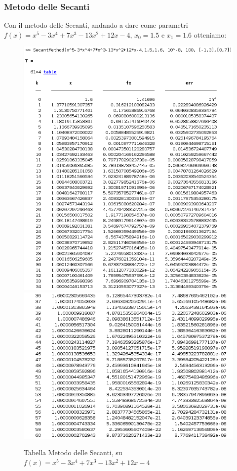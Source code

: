 \documentclass[12pt, letterpaper]{article}
\begin{document}
\subsubsection{Metodo delle Secanti}
Con il metodo delle Secanti, andando a dare come parametri $f(x)=x^5-3x^4+7x^3-13x^2+12x-4$, $x_0=  1.5$ e $x_1=1.6$ otteniamo:
\begin{figure}[ht!]
    \includegraphics[scale=0.7]{TabellaMultiRadixSecant1.png}
    \includegraphics[scale=0.7  ]{TabellaMultiRadixSecant2.png}
    \caption{Tabella Metodo delle Secanti, su $f(x)=x^5-3x^4+7x^3-13x^2+12x-4$}
\end{figure}
\end{document}
